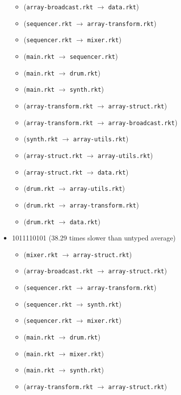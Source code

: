 \documentclass{article}
\newcommand{\mono}[1]{\texttt{#1}}
\begin{document}
\begin{itemize}
\begin{itemize}
  \item (\mono{array-broadcast.rkt} $\rightarrow$ \mono{data.rkt})
  \item (\mono{sequencer.rkt} $\rightarrow$ \mono{array-transform.rkt})
  \item (\mono{sequencer.rkt} $\rightarrow$ \mono{mixer.rkt})
  \item (\mono{main.rkt} $\rightarrow$ \mono{sequencer.rkt})
  \item (\mono{main.rkt} $\rightarrow$ \mono{drum.rkt})
  \item (\mono{main.rkt} $\rightarrow$ \mono{synth.rkt})
  \item (\mono{array-transform.rkt} $\rightarrow$ \mono{array-struct.rkt})
  \item (\mono{array-transform.rkt} $\rightarrow$ \mono{array-broadcast.rkt})
  \item (\mono{synth.rkt} $\rightarrow$ \mono{array-utils.rkt})
  \item (\mono{array-struct.rkt} $\rightarrow$ \mono{array-utils.rkt})
  \item (\mono{array-struct.rkt} $\rightarrow$ \mono{data.rkt})
  \item (\mono{drum.rkt} $\rightarrow$ \mono{array-utils.rkt})
  \item (\mono{drum.rkt} $\rightarrow$ \mono{array-transform.rkt})
  \item (\mono{drum.rkt} $\rightarrow$ \mono{data.rkt})
  \end{itemize}
\item 1011110101 (38.29 times slower than untyped average)
  \begin{itemize}
  \item (\mono{mixer.rkt} $\rightarrow$ \mono{array-struct.rkt})
  \item (\mono{array-broadcast.rkt} $\rightarrow$ \mono{array-struct.rkt})
  \item (\mono{sequencer.rkt} $\rightarrow$ \mono{array-transform.rkt})
  \item (\mono{sequencer.rkt} $\rightarrow$ \mono{synth.rkt})
  \item (\mono{sequencer.rkt} $\rightarrow$ \mono{mixer.rkt})
  \item (\mono{main.rkt} $\rightarrow$ \mono{drum.rkt})
  \item (\mono{main.rkt} $\rightarrow$ \mono{mixer.rkt})
  \item (\mono{main.rkt} $\rightarrow$ \mono{synth.rkt})
  \item (\mono{array-transform.rkt} $\rightarrow$ \mono{array-struct.rkt})

\end{itemize}
\end{itemize}
\end{document}
